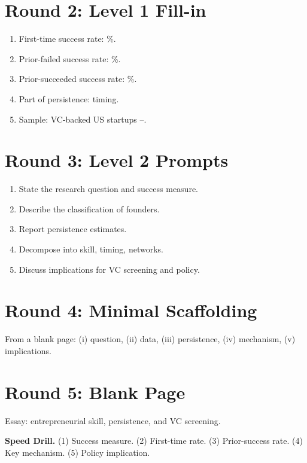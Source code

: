 \documentclass[11pt]{article}
\newcommand{\blank}[1]{\underline{\hspace{#1}}}
\begin{document}
\section*{Round 2: Level 1 Fill-in}
\begin{enumerate}
\item First-time success rate: \blank{1cm}\%.
\item Prior-failed success rate: \blank{1cm}\%.
\item Prior-succeeded success rate: \blank{1cm}\%.
\item Part of persistence: \blank{2cm} timing.
\item Sample: VC-backed US startups \blank{1cm}--\blank{1cm}.
\end{enumerate}

\section*{Round 3: Level 2 Prompts}
\begin{enumerate}
\item State the research question and success measure.
\item Describe the classification of founders.
\item Report persistence estimates.
\item Decompose into skill, timing, networks.
\item Discuss implications for VC screening and policy.
\end{enumerate}

\section*{Round 4: Minimal Scaffolding}
From a blank page: (i) question, (ii) data, (iii) persistence, (iv) mechanism, (v) implications.

\section*{Round 5: Blank Page}
Essay: entrepreneurial skill, persistence, and VC screening.

\vspace{6pt}
\begin{drillbox}
\textbf{Speed Drill.} (1) Success measure. (2) First-time rate. (3) Prior-success rate. (4) Key mechanism. (5) Policy implication.
\end{drillbox}
\end{document}
